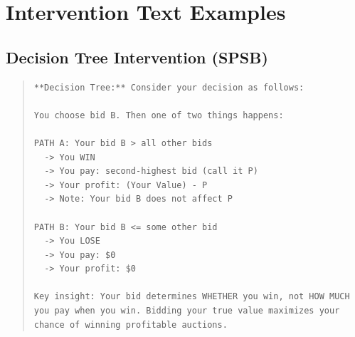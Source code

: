 \documentclass[12pt]{article}
\begin{document}
\appendix
\section{Intervention Text Examples}

\subsection{Decision Tree Intervention (SPSB)}
\begin{quote}
\begin{verbatim}
**Decision Tree:** Consider your decision as follows:

You choose bid B. Then one of two things happens:

PATH A: Your bid B > all other bids
  -> You WIN
  -> You pay: second-highest bid (call it P)
  -> Your profit: (Your Value) - P
  -> Note: Your bid B does not affect P

PATH B: Your bid B <= some other bid
  -> You LOSE
  -> You pay: $0
  -> Your profit: $0

Key insight: Your bid determines WHETHER you win, not HOW MUCH
you pay when you win. Bidding your true value maximizes your
chance of winning profitable auctions.
\end{verbatim}
\end{quote}



\end{document}
